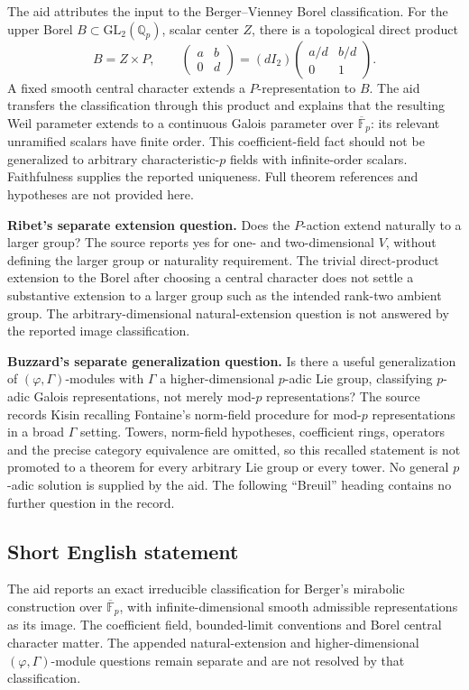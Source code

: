 \documentclass[11pt]{article}
\newcommand{\Q}{\mathbb{Q}}
\newcommand{\F}{\mathbb{F}}
\begin{document}
The aid attributes the input to the Berger--Vienney Borel classification. For the upper Borel \(B\subset\mathrm{GL}_2(\Q_p)\), scalar center \(Z\), there is a topological direct product
\[
 B=Z\times P,\qquad
 \begin{pmatrix}a&b\\0&d\end{pmatrix}
 =(dI_2)\begin{pmatrix}a/d&b/d\\0&1\end{pmatrix}.
\]
A fixed smooth central character extends a \(P\)-representation to \(B\). The aid transfers the classification through this product and explains that the resulting Weil parameter extends to a continuous Galois parameter over \(\overline{\F}_p\): its relevant unramified scalars have finite order. This coefficient-field fact should not be generalized to arbitrary characteristic-\(p\) fields with infinite-order scalars. Faithfulness supplies the reported uniqueness. Full theorem references and hypotheses are not provided here.

\textbf{Ribet's separate extension question.} Does the \(P\)-action extend naturally to a larger group? The source reports yes for one- and two-dimensional \(V\), without defining the larger group or naturality requirement. The trivial direct-product extension to the Borel after choosing a central character does not settle a substantive extension to a larger group such as the intended rank-two ambient group. The arbitrary-dimensional natural-extension question is not answered by the reported image classification.

\textbf{Buzzard's separate generalization question.} Is there a useful generalization of \((\varphi,\Gamma)\)-modules with \(\Gamma\) a higher-dimensional \(p\)-adic Lie group, classifying \(p\)-adic Galois representations, not merely mod-\(p\) representations? The source records Kisin recalling Fontaine's norm-field procedure for mod-\(p\) representations in a broad \(\Gamma\) setting. Towers, norm-field hypotheses, coefficient rings, operators and the precise category equivalence are omitted, so this recalled statement is not promoted to a theorem for every arbitrary Lie group or every tower. No general \(p\)-adic solution is supplied by the aid. The following ``Breuil'' heading contains no further question in the record.
\subsection{Short English statement}
The aid reports an exact irreducible classification for Berger's mirabolic construction over \(\overline{\F}_p\), with infinite-dimensional smooth admissible representations as its image. The coefficient field, bounded-limit conventions and Borel central character matter. The appended natural-extension and higher-dimensional \((\varphi,\Gamma)\)-module questions remain separate and are not resolved by that classification.
\end{document}
